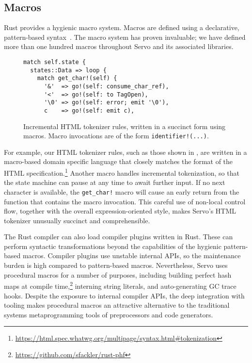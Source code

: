 \subsection{Macros}

Rust provides a hygienic macro system. Macros are defined using a declarative, pattern-based syntax~\cite{Kohlbecker:1987:MDS:41625.41632}. The macro system has proven invaluable; we have defined more than one hundred macros throughout Servo and its associated libraries.

\begin{figure}
\begin{lstlisting}
match self.state {
  states::Data => loop {
    match get_char!(self) {
      '&'  => go!(self: consume_char_ref),
      '<'  => go!(self: to TagOpen),
      '\0' => go!(self: error; emit '\0'),
      c    => go!(self: emit c),
\end{lstlisting}
  \caption{Incremental HTML tokenizer rules, written in a succinct form using macros. Macro invocations are of the form \lstinline{identifier!(...)}.}
  \label{fig:tokenizer-macros}
\end{figure}

For example, our HTML tokenizer rules, such as those shown in , are written in a macro-based domain specific language that closely matches the format of the HTML specification.\footnote{\url{https://html.spec.whatwg.org/multipage/syntax.html#tokenization}} Another macro handles incremental tokenization, so that the state machine can pause at any time to await further input. If no next character is available, the \lstinline{get_char!} macro will cause an early return from the function that contains the macro invocation. This careful use of non-local control flow, together with the overall expression-oriented style, makes Servo's HTML tokenizer unusually succinct and comprehensible.

The Rust compiler can also load compiler plugins written in Rust. These can perform syntactic transformations beyond the capabilities of the hygienic pattern-based macros. Compiler plugins use unstable internal APIs, so the maintenance burden is high compared to pattern-based macros. Nevertheless, Servo uses procedural macros for a number of purposes, including building perfect hash maps at compile time,\footnote{\url{https://github.com/sfackler/rust-phf}} interning string literals, and auto-generating GC trace hooks. Despite the exposure to internal compiler APIs, the deep integration with tooling makes procedural macros an attractive alternative to the traditional systems metaprogramming tools of preprocessors and code generators.

